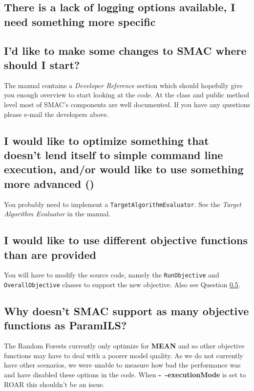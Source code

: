 \documentclass[11pt,letterpaper,oneside]{article}
\begin{document}
\subsection{There is a lack of logging options available, I need something more specific}
\label{sec:alternative-logging}
	

	
	
\subsection{I'd like to make some changes to SMAC where should I start?}

	The manual contains a \emph{Developer Reference} section which should hopefully give you enough overview to start looking at the code. At the class and public method level most of SMAC's components are well documented. If you have any questions please e-mail the developers above.

\subsection{I would like to optimize something that doesn't lend itself to simple command line execution, and/or would like to use something more advanced ()}

	You probably need to implement a \texttt{TargetAlgorithmEvaluator}. See the \emph{Target Algorithm Evaluator} in the manual.

\subsection{I would like to use different objective functions than are provided}

	You will have to modify the source code, namely the \texttt{RunObjective} and \texttt{OverallObjective} classes to support the new objective. Also see Question \ref{sec:rf-objectives}.

\subsection{Why doesn't SMAC support as many objective functions as ParamILS?}
\label{sec:rf-objectives}

	The Random Forests currently only optimize for \textbf{MEAN} and so other objective functions may have to deal with a poorer model quality. As we do not currently have other scenarios, we were unable to measure how bad the performance was and have disabled these options in the code. When \textbf{-~$\!$-executionMode} is set to ROAR this shouldn't be an issue.
\end{document}
